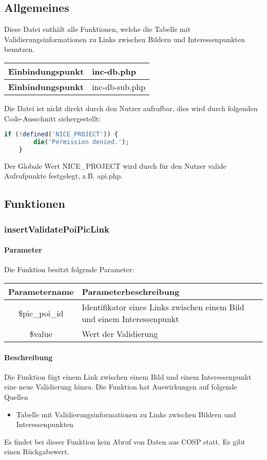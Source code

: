 \subsection{Allgemeines} Diese Datei enthält alle Funktionen, welche die Tabelle mit Validierungsinformationen zu Links zwischen Bildern und Interessenpunkten benutzen.
\begin{table}[H]
	\begin{tabular}{|c|p{11cm}|}
		\hline
		\textbf{Einbindungspunkt} & inc-db.php \\ \hline
		\textbf{Einbindungspunkt} & inc-db-sub.php \\ \hline
	\end{tabular}
\end{table}
Die Datei ist nicht direkt durch den Nutzer aufrufbar, dies wird durch folgenden Code-Ausschnitt sichergestellt:
\begin{lstlisting}[language=php]
	if (!defined('NICE_PROJECT')) {
		die('Permission denied.');
	}
\end{lstlisting}
Der Globale Wert {\glqq NICE\_PROJECT\grqq} wird durch für den Nutzer valide Aufrufpunkte festgelegt, z.B. {\glqq api.php\grqq}.
\newpage
\subsection{Funktionen}
\subsubsection{insertValidatePoiPicLink}
\paragraph{Parameter} Die Funktion besitzt folgende Parameter:
\begin{table}[H]
	\begin{tabular}{|c|p{11cm}|}
		\hline
		\textbf{Parametername} & \textbf{Parameterbeschreibung} \\ \hline
		\$pic\_poi\_id & Identifikator eines Links zwischen einem Bild und einem Interessenpunkt \\ \hline
		\$value        & Wert der Validierung \\ \hline
	\end{tabular}
\end{table}
\paragraph{Beschreibung} Die Funktion fügt einem Link zwischen einem Bild und einem Interessenpunkt eine neue Validierung hinzu. Die Funktion hat Auswirkungen auf folgende Quellen
\begin{itemize}
	\item Tabelle mit Validierungsinformationen zu Links zwischen Bildern und Interessenpunkten
\end{itemize}
Es findet bei dieser Funktion kein Abruf von Daten aus {\glqq COSP\grqq} statt. Es gibt einen Rückgabewert.
